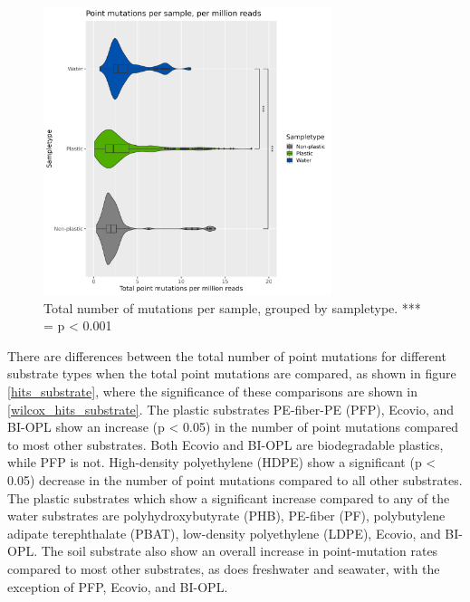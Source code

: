 \begin{figure}[h!]
    \centering
    \includegraphics[width = 0.75\textwidth]{figure/hits_per_million_type.png}
    \caption{Total number of mutations per sample, grouped by sampletype. *** = p < 0.001}
    \label{hits_type}
\end{figure}

There are differences between the total number of point mutations for different substrate types when the total point mutations are compared, as shown in figure \ref{hits_substrate}, where the significance of these comparisons are shown in \ref{wilcox_hits_substrate}.
The plastic substrates PE-fiber-PE (PFP), Ecovio, and BI-OPL show an increase (p < 0.05) in the number of point mutations compared to most other substrates. Both Ecovio and BI-OPL are biodegradable plastics, while PFP is not.
High-density polyethylene (HDPE) show a significant (p < 0.05) decrease in the number of point mutations compared to all other substrates.
The plastic substrates which show a significant increase compared to any of the water substrates are polyhydroxybutyrate (PHB), PE-fiber (PF), polybutylene adipate terephthalate (PBAT), low-density polyethylene (LDPE), Ecovio, and BI-OPL.
The soil substrate also show an overall increase in point-mutation rates compared to most other substrates, as does freshwater and seawater, with the exception of PFP, Ecovio, and BI-OPL. 

